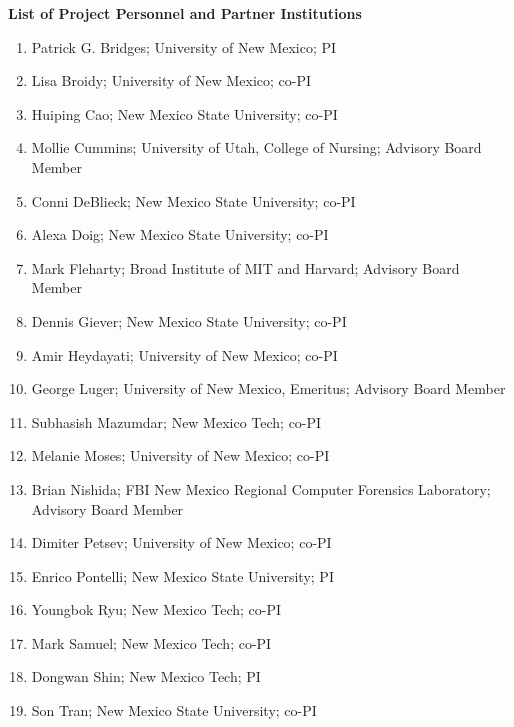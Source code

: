 \documentclass[11pt]{article}
\begin{document}
\begin{center}
{\Large\sc\bf List of Project Personnel and Partner Institutions}
\end{center}

\begin{enumerate}
\item Patrick G. Bridges; University of New Mexico; PI
\item Lisa Broidy; University of New Mexico; co-PI
\item Huiping Cao; New Mexico State University; co-PI
\item Mollie Cummins; University of Utah, College of Nursing; Advisory Board Member
\item Conni DeBlieck; New Mexico State University; co-PI
\item Alexa Doig; New Mexico State University; co-PI
\item Mark Fleharty; Broad Institute of MIT and Harvard; Advisory Board Member
\item Dennis Giever; New Mexico State University; co-PI
\item Amir Heydayati; University of New Mexico; co-PI
\item George Luger; University of New Mexico, Emeritus; Advisory Board Member
\item Subhasish Mazumdar; New Mexico Tech; co-PI
\item Melanie Moses; University of New Mexico; co-PI
\item Brian Nishida; FBI New Mexico Regional Computer Forensics Laboratory; Advisory Board Member
\item Dimiter Petsev; University of New Mexico; co-PI
\item Enrico Pontelli; New Mexico State University; PI
\item Youngbok Ryu; New Mexico Tech; co-PI
\item Mark Samuel; New Mexico Tech; co-PI
\item Dongwan Shin; New Mexico Tech; PI
\item Son Tran; New Mexico State University; co-PI
\end{enumerate}
\end{document}
